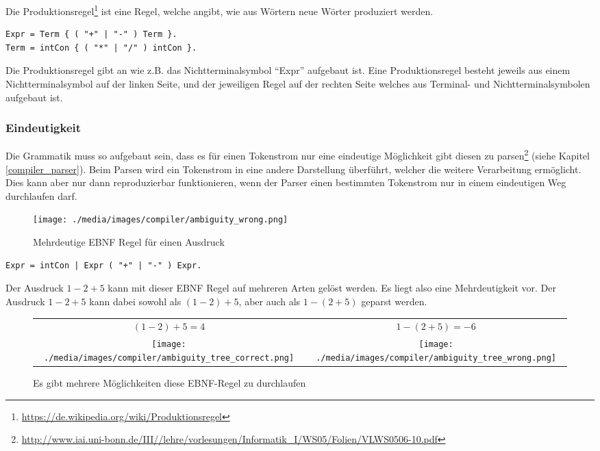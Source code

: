 Die Produktionsregel\footnote{\url{https://de.wikipedia.org/wiki/Produktionsregel}} ist eine Regel, welche angibt, wie aus W\"ortern neue W\"orter produziert werden.

\begin{lstlisting}[language=EBNF, backgroundcolor=\color{highlight}]
Expr = Term { ( "+" | "-" ) Term }.
Term = intCon { ( "*" | "/" ) intCon }.
\end{lstlisting}

Die Produktionsregel gibt an wie z.B. das Nichtterminalsymbol ``Expr'' aufgebaut ist. Eine Produktionsregel besteht jeweils aus einem Nichtterminalsymbol auf der linken Seite, und der jeweiligen Regel auf der rechten Seite welches aus Terminal- und Nichtterminalsymbolen aufgebaut ist.

\newpage

\subsubsection{Eindeutigkeit}

Die Grammatik muss so aufgebaut sein, dass es für einen Tokenstrom nur eine eindeutige Möglichkeit gibt diesen zu parsen\footnote{\url{http://www.iai.uni-bonn.de/III//lehre/vorlesungen/Informatik_I/WS05/Folien/VLWS0506-10.pdf}} (siehe Kapitel \ref{compiler_parser}). Beim Parsen wird ein Tokenstrom in eine andere Darstellung \"uberf\"uhrt, welcher die weitere Verarbeitung erm\"oglicht. Dies kann aber nur dann reproduzierbar funktionieren, wenn der Parser einen bestimmten Tokenstrom nur in einem eindeutigen Weg durchlaufen darf.


\begin{figure}[h]
\centering
\texttt{[image: ./media/images/compiler/ambiguity\_wrong.png]}
\caption{Mehrdeutige EBNF Regel f\"ur einen Ausdruck}
\label{compiler_ambiguity_wrong}
\end{figure}

\begin{lstlisting}[language=EBNF]
Expr = intCon | Expr ( "+" | "-" ) Expr.
\end{lstlisting}

Der Ausdruck $1-2+5$ kann mit dieser EBNF Regel auf mehreren Arten gelöst werden. Es liegt also eine Mehrdeutigkeit vor. Der Ausdruck $1-2+5$ kann dabei sowohl als $(1-2)+5$, aber auch als $1-(2+5)$ geparst werden.

\begin{figure}[h]
\centering
\begin{tabular}{ c | c }
  $(1-2)+5=4$ & 
  $1-(2+5)=-6$ \\
  \texttt{[image: ./media/images/compiler/ambiguity\_tree\_correct.png]} & 
  \texttt{[image: ./media/images/compiler/ambiguity\_tree\_wrong.png]} \\
\end{tabular}
\caption{Es gibt mehrere M\"oglichkeiten diese EBNF-Regel zu durchlaufen}
\label{compiler_ambiguity_wrong_possible_ways}
\end{figure}

